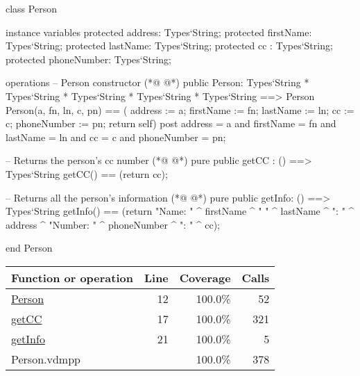 \begin{vdmpp}[breaklines=true]
class Person

instance variables
  protected address: Types`String;
  protected firstName: Types`String;
  protected lastName: Types`String;
  protected cc : Types`String;
  protected phoneNumber: Types`String;
  
operations
 -- Person constructor
(*@
\label{Person:12}
@*)
 public Person: Types`String * Types`String * Types`String * Types`String * Types`String ==> Person
  Person(a, fn, ln, c, pn) == ( address := a; firstName := fn; lastName := ln; cc := c; phoneNumber := pn; return self)
 post address = a and firstName = fn and lastName = ln and cc = c and phoneNumber = pn;
 
 -- Returns the person's cc number
(*@
\label{getCC:17}
@*)
 pure public getCC : () ==> Types`String
  getCC() == (return cc);
 
 -- Returns all the person's information
(*@
\label{getInfo:21}
@*)
 pure public getInfo: () ==> Types`String
  getInfo() == (return "Name: " ^ firstName ^ " " ^ lastName ^ "\nAddress: " ^ address ^ "\nPhone Number: " ^ phoneNumber ^ "\nCC: " ^ cc);

end Person
\end{vdmpp}
\bigskip
\begin{longtable}{|l|r|r|r|}
\hline
Function or operation & Line & Coverage & Calls \\
\hline
\hline
\hyperref[Person:12]{Person} & 12&100.0\% & 52 \\
\hline
\hyperref[getCC:17]{getCC} & 17&100.0\% & 321 \\
\hline
\hyperref[getInfo:21]{getInfo} & 21&100.0\% & 5 \\
\hline
\hline
Person.vdmpp & & 100.0\% & 378 \\
\hline
\end{longtable}

